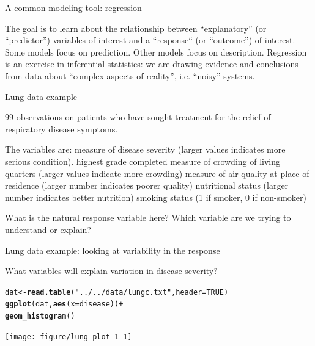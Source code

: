 \documentclass[table]{beamer}\usepackage[]{graphicx}\usepackage[]{color}
\makeatletter
\newcommand{\hlnum}[1]{\textcolor[rgb]{0.686,0.059,0.569}{#1}}%
\newcommand{\hlstr}[1]{\textcolor[rgb]{0.192,0.494,0.8}{#1}}%
\newcommand{\hlopt}[1]{\textcolor[rgb]{0,0,0}{#1}}%
\newcommand{\hlstd}[1]{\textcolor[rgb]{0.345,0.345,0.345}{#1}}%
\newcommand{\hlkwb}[1]{\textcolor[rgb]{0.69,0.353,0.396}{#1}}%
\newcommand{\hlkwc}[1]{\textcolor[rgb]{0.333,0.667,0.333}{#1}}%
\newcommand{\hlkwd}[1]{\textcolor[rgb]{0.737,0.353,0.396}{\textbf{#1}}}%
\newenvironment{kframe}{%
 \def\at@end@of@kframe{}%
 \ifinner\ifhmode%
  \def\at@end@of@kframe{\end{minipage}}%
  \begin{minipage}{\columnwidth}%
 \fi\fi%
 \def\FrameCommand##1{\hskip\@totalleftmargin \hskip-\fboxsep
 \colorbox{shadecolor}{##1}\hskip-\fboxsep
     \hskip-\linewidth \hskip-\@totalleftmargin \hskip\columnwidth}%
 \MakeFramed {\advance\hsize-\width
   \@totalleftmargin\z@ \linewidth\hsize
   \@setminipage}}%
 {\par\unskip\endMakeFramed%
 \at@end@of@kframe}
\newenvironment{knitrout}{}{} %
\makeatother
\begin{document}

\begin{frame}{A common modeling tool: regression}

\bi
        \myitem The goal is to learn about the relationship between ``explanatory'' (or ``predictor'') variables of interest and a ``response`` (or  ``outcome'') of interest.
	\bi
		\myitem Some models focus on prediction.
		\myitem Other models focus on description.
	\ei
	\myitem Regression is an exercise in inferential statistics: we are drawing evidence and conclusions from data about ``complex aspects of reality'', i.e. ``noisy'' systems.
\ei


\end{frame}




\begin{frame}[t]{Lung data example}

99 observations on patients who have sought treatment for the relief of respiratory disease symptoms. 

The variables are:
\bi
     measure of disease severity (larger values indicates more serious condition).
     highest grade completed
     measure of crowding of living quarters (larger values indicate more crowding)
     measure of air quality at place of residence (larger number indicates poorer quality)
     nutritional status (larger number indicates better nutrition)
     smoking status (1 if smoker, 0 if non-smoker)
\ei

What is the natural response variable here? Which variable are we trying to understand or explain?

\end{frame}



\begin{frame}[fragile]{Lung data example: looking at variability in the response}



What variables will explain variation in disease severity?

\begin{knitrout}\footnotesize
{}\color{fgcolor}\begin{kframe}
\begin{alltt}
\hlstd{dat} \hlkwb{<-} \hlkwd{read.table}\hlstd{(}\hlstr{"../../data/lungc.txt"}\hlstd{,} \hlkwc{header}\hlstd{=}\hlnum{TRUE}\hlstd{)}
\hlkwd{ggplot}\hlstd{(dat,} \hlkwd{aes}\hlstd{(}\hlkwc{x}\hlstd{=disease))} \hlopt{+}
  \hlkwd{geom_histogram}\hlstd{()}
\end{alltt}
\end{kframe}
\texttt{[image: figure/lung-plot-1-1]} 

\end{knitrout}


\end{frame}
\end{document}
